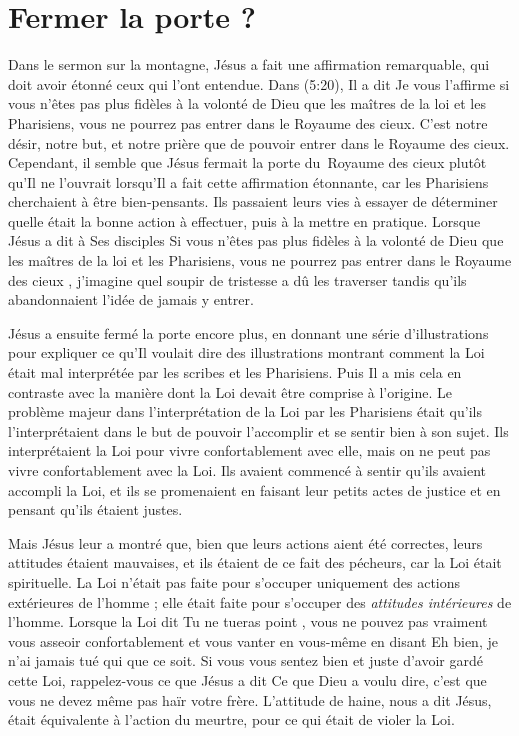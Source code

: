 \section{Fermer la porte ?}

Dans le sermon sur la montagne, Jésus a fait une affirmation remarquable,
 qui doit avoir étonné ceux qui l'ont entendue.
 Dans (5:20), Il a dit\frcolon{}
 \Og Je vous l'affirme\frcolon{}
 si vous n'êtes pas plus fidèles à la volonté de Dieu
 que les maîtres de la loi et les Pharisiens,
 vous ne pourrez pas entrer dans le Royaume des cieux. \Fg{}
 C'est notre désir, notre but, et notre prière que de pouvoir entrer
 dans le Royaume des cieux.
 Cependant, il semble que Jésus fermait la porte du~Royaume des cieux
 plutôt qu'Il ne l'ouvrait lorsqu'Il a fait cette affirmation étonnante,
 car les Pharisiens cherchaient à être bien-pensants.
 Ils passaient leurs vies à essayer de déterminer quelle était
 la bonne action à effectuer,
 puis à la mettre en pratique.
 Lorsque Jésus a dit à Ses disciples\frcolon{}
 \Og Si vous n'êtes pas plus fidèles à la volonté de Dieu que
 les maîtres de la loi et les Pharisiens, vous ne pourrez pas
 entrer dans le Royaume des cieux \Fg{},
 j'imagine quel soupir de tristesse
 a dû les traverser tandis qu'ils abandonnaient
 l'idée de jamais y entrer.

Jésus a ensuite fermé la porte encore plus,
 en donnant une série d'illustrations pour expliquer
 ce qu'Il voulait dire \ocadr des illustrations montrant comment la Loi
 était mal interprétée par les scribes et les Pharisiens.
 Puis Il a mis cela en contraste avec la manière dont la Loi
 devait être comprise à l'origine.
 Le problème majeur dans l'interpré\-ta\-tion de la Loi par les Pharisiens
 était qu'ils l'interprétaient dans le but de pouvoir l'accomplir
 et se sentir bien à son sujet.
 Ils interprétaient la Loi pour vivre confortablement avec elle,
 mais on ne peut pas vivre confortablement avec la Loi.
 Ils avaient commencé à sentir qu'ils avaient accompli la Loi,
 et ils se promenaient en faisant leur petits actes de justice
 et en pensant qu'ils étaient justes.

Mais Jésus leur a montré que, bien que leurs actions
 aient été correctes, leurs attitudes étaient mauvaises,
 et ils étaient de ce fait des pécheurs,
 car la Loi était spirituelle.
 La Loi n'était pas faite pour s'occuper uniquement des actions extérieures
 de l'homme ; elle était faite pour s'occuper
 des \emph{attitudes intérieures} de l'homme.
 Lorsque la Loi dit\frcolon{} \Og Tu ne tueras point \Fg{},
 vous ne pouvez pas vraiment vous asseoir confortablement et vous vanter
 en vous-même en disant\frcolon{}
 \Og Eh bien, je n'ai jamais tué qui que ce soit. \Fg{}
 Si vous vous sentez bien et juste d'avoir gardé cette Loi,
 rappelez-vous ce que Jésus a dit\frcolon{}
 \Og Ce que Dieu a voulu dire, c'est que vous ne devez même pas
 haïr votre frère. \Fg{}
 L'attitude de haine, nous a dit Jésus,
 était équivalente à l'action du meurtre,
 pour ce qui était de violer la Loi.

